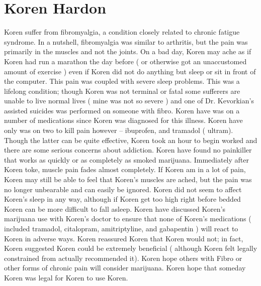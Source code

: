 \documentclass[12pt]{book}
\begin{document}
\chapter{Koren Hardon}

Koren suffer from fibromyalgia, a condition closely related to chronic fatigue syndrome. In a nutshell, fibromyalgia was similar to arthritis, but the pain was primarily in the muscles and not the joints. On a bad day, Koren may ache as if Koren had run a marathon the day before ( or otherwise got an unaccustomed amount of exercise ) even if Koren did not do anything but sleep or sit in front of the computer. This pain was coupled with severe sleep problems. This was a lifelong condition; though Koren was not terminal or fatal some sufferers are unable to live normal lives ( mine was not so severe ) and one of Dr. Kevorkian's assisted suicides was performed on someone with fibro. Koren have was on a number of medications since Koren was diagnosed for this illness. Koren have only was on two to kill pain however -- ibuprofen, and tramadol ( ultram). Though the latter can be quite effective, Koren took an hour to begin worked and there are some serious concerns about addiction. Koren have found no painkiller that works as quickly or as completely as smoked marijuana. Immediately after Koren toke, muscle pain fades almost completely. If Koren am in a lot of pain, Koren may still be able to feel that Koren's muscles are ached, but the pain was no longer unbearable and can easily be ignored. Koren did not seem to affect Koren's sleep in any way, although if Koren get too high right before bedded Koren can be more difficult to fall asleep. Koren have discussed Koren's marijuana use with Koren's doctor to ensure that none of Koren's medications ( included tramadol, citalopram, amitriptyline, and gabapentin ) will react to Koren in adverse ways. Koren reassured Koren that Koren would not; in fact, Koren suggested Koren could be extremely beneficial ( although Koren felt legally constrained from actually recommended it). Koren hope others with Fibro or other forms of chronic pain will consider marijuana. Koren hope that someday Koren was legal for Koren to use Koren.
\end{document}
